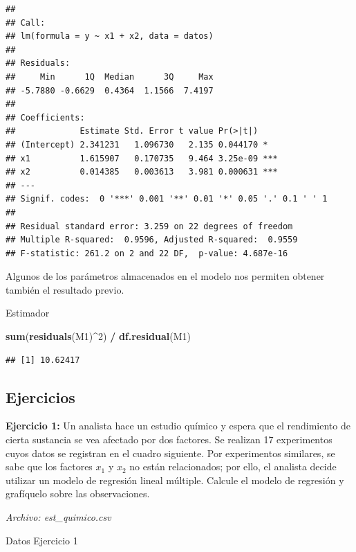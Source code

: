 \documentclass[
]{book}
\newenvironment{Shaded}{\begin{snugshade}}{\end{snugshade}}
\newcommand{\DecValTok}[1]{\textcolor[rgb]{0.00,0.00,0.81}{#1}}
\newcommand{\FunctionTok}[1]{\textcolor[rgb]{0.13,0.29,0.53}{\textbf{#1}}}
\newcommand{\NormalTok}[1]{#1}
\newcommand{\SpecialCharTok}[1]{\textcolor[rgb]{0.81,0.36,0.00}{\textbf{#1}}}
\begin{document}
\begin{verbatim}
## 
## Call:
## lm(formula = y ~ x1 + x2, data = datos)
## 
## Residuals:
##     Min      1Q  Median      3Q     Max 
## -5.7880 -0.6629  0.4364  1.1566  7.4197 
## 
## Coefficients:
##             Estimate Std. Error t value Pr(>|t|)    
## (Intercept) 2.341231   1.096730   2.135 0.044170 *  
## x1          1.615907   0.170735   9.464 3.25e-09 ***
## x2          0.014385   0.003613   3.981 0.000631 ***
## ---
## Signif. codes:  0 '***' 0.001 '**' 0.01 '*' 0.05 '.' 0.1 ' ' 1
## 
## Residual standard error: 3.259 on 22 degrees of freedom
## Multiple R-squared:  0.9596, Adjusted R-squared:  0.9559 
## F-statistic: 261.2 on 2 and 22 DF,  p-value: 4.687e-16
\end{verbatim}

Algunos de los parámetros almacenados en el modelo nos permiten obtener también el resultado previo.

Estimador

\begin{Shaded}
\begin{Highlighting}[]
\FunctionTok{sum}\NormalTok{(}\FunctionTok{residuals}\NormalTok{(M1)}\SpecialCharTok{\^{}}\DecValTok{2}\NormalTok{) }\SpecialCharTok{/} \FunctionTok{df.residual}\NormalTok{(M1)}
\end{Highlighting}
\end{Shaded}

\begin{verbatim}
## [1] 10.62417
\end{verbatim}

\subsection{Ejercicios}\label{ejercicios}

\textbf{Ejercicio 1:} Un analista hace un estudio químico y espera que el rendimiento de cierta sustancia se vea afectado por dos factores. Se realizan 17 experimentos cuyos datos se registran en el cuadro siguiente. Por experimentos similares, se sabe que los factores \(x_1\) y \(x_2\) no están relacionados; por ello, el analista decide utilizar un modelo de regresión lineal múltiple. Calcule el modelo de regresión y grafíquelo sobre las observaciones.

\emph{Archivo: est\_quimico.csv}

Datos Ejercicio 1
\end{document}
